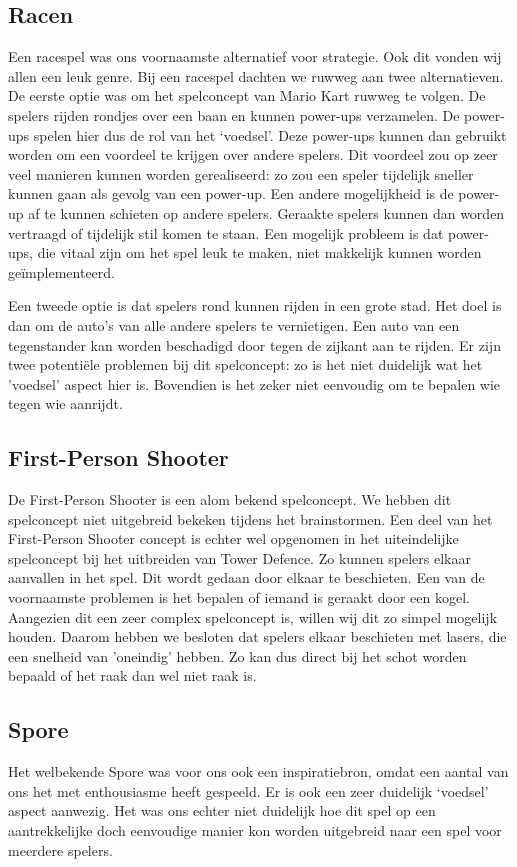 \subsection{Racen}
Een racespel was ons voornaamste alternatief voor strategie. Ook dit vonden wij allen een leuk genre. Bij een racespel dachten we ruwweg aan twee alternatieven. De eerste optie was om het spelconcept van Mario Kart ruwweg te volgen. De spelers rijden rondjes over een baan en kunnen power-ups verzamelen. De power-ups spelen hier dus de rol van het `voedsel'. Deze power-ups kunnen dan gebruikt worden om een voordeel te krijgen over andere spelers. Dit voordeel zou op zeer veel manieren kunnen worden gerealiseerd: zo zou een speler tijdelijk sneller kunnen gaan als gevolg van een power-up. Een andere mogelijkheid is de power-up af te kunnen schieten op andere spelers. Geraakte spelers kunnen dan worden vertraagd of tijdelijk stil komen te staan. Een mogelijk probleem is dat power-ups, die vitaal zijn om het spel leuk te maken, niet makkelijk kunnen worden ge\"implementeerd.

Een tweede optie is dat spelers rond kunnen rijden in een grote stad. Het doel is dan om de auto's van alle andere spelers te vernietigen. Een auto van een tegenstander kan worden beschadigd door tegen de zijkant aan te rijden. Er zijn twee potenti\"ele problemen bij dit spelconcept: zo is het niet duidelijk wat het 'voedsel' aspect hier is. Bovendien is het zeker niet eenvoudig om te bepalen wie tegen wie aanrijdt.

\subsection{First-Person Shooter}
De First-Person Shooter is een alom bekend spelconcept. We hebben dit spelconcept niet uitgebreid bekeken tijdens het brainstormen. Een deel van het First-Person Shooter concept is echter wel opgenomen in het uiteindelijke spelconcept bij het uitbreiden van Tower Defence. Zo kunnen spelers elkaar aanvallen in het spel. Dit wordt gedaan door elkaar te beschieten. Een van de voornaamste problemen is het bepalen of iemand is geraakt door een kogel. Aangezien dit een zeer complex spelconcept is, willen wij dit zo simpel mogelijk houden. Daarom hebben we besloten dat spelers elkaar beschieten met lasers, die een snelheid van 'oneindig' hebben. Zo kan dus direct bij het schot worden bepaald of het raak dan wel niet raak is.

\subsection{Spore}
Het welbekende Spore was voor ons ook een inspiratiebron, omdat een aantal van ons het met enthousiasme heeft gespeeld. Er is ook een zeer duidelijk `voedsel' aspect aanwezig. Het was ons echter niet duidelijk hoe dit spel op een aantrekkelijke doch eenvoudige manier kon worden uitgebreid naar een spel voor meerdere spelers.

